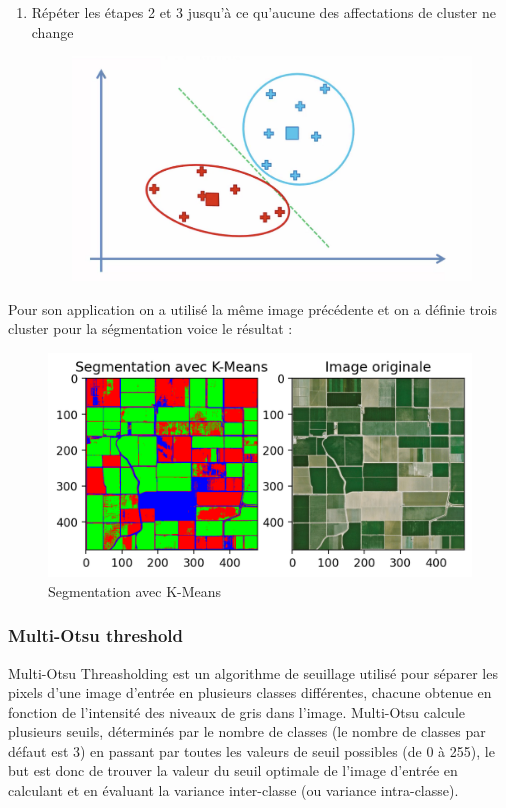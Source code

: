 \documentclass[12pt, openany]{report}
\begin{document}
\begin{enumerate}
\begin{figure}[H]
        \end{figure}
    \item Répéter les étapes 2 et 3 jusqu'à ce qu'aucune des affectations de cluster ne change
        \begin{figure}[H]
        \centering
        \includegraphics[scale=0.2]{algo4.png}
        \end{figure}
\end{enumerate}


\par
Pour son application on a utilisé la même image précédente et on a définie trois cluster pour la ségmentation voice le résultat : 

\begin{figure}[H]
\centering
\includegraphics[scale=1.2]{kmeans.png}
\caption{Segmentation avec K-Means}
\end{figure}

\subsubsection{Multi-Otsu threshold}
\cite{otsu}Multi-Otsu Threasholding est un algorithme de seuillage utilisé pour séparer les pixels d'une image d'entrée en plusieurs classes différentes, chacune obtenue en fonction de l'intensité des niveaux de gris dans l'image.
Multi-Otsu calcule plusieurs seuils, déterminés par le nombre de classes (le nombre de classes par défaut est 3) en passant par toutes les valeurs de seuil possibles (de 0 à 255), le but est donc de trouver la valeur du seuil optimale de l'image d'entrée en calculant et en évaluant la variance inter-classe (ou variance intra-classe).
\end{document}
